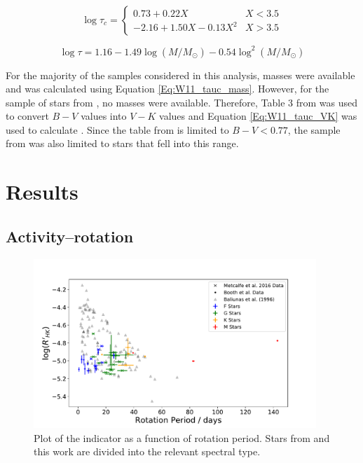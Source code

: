 \begin{equation}
    \log \tau_{c} = 
    \begin{cases}
        0.73 + 0.22X & X < 3.5 \\
        -2.16 +1.50X - 0.13X^{2} & X > 3.5
    \end{cases}
    \label{Eq:W11_tauc_VK}
\end{equation}

\begin{equation}
    \log \tau = 1.16 - 1.49\log(M/M_{\odot}) - 0.54\log^{2}(M/M_{\odot})
    \label{Eq:W11_tauc_mass}
\end{equation}

For the majority of the samples considered in this analysis, masses were available and \tauc was calculated using Equation \ref{Eq:W11_tauc_mass}. However, for the sample of stars from \citet{Baliunas_etal_1996}, no masses were available. Therefore, Table 3 from \citet{Pecaut_etal_2012} was used to convert $B-V$ values into $V-K$ values and Equation \ref{Eq:W11_tauc_VK} was used to calculate \tauc. Since the table from \citet{Pecaut_etal_2012} is limited to $B-V < 0.77$, the sample from \citet{Baliunas_etal_1996} was also limited to stars that fell into this range.

\section{Results}

\subsection{Activity--rotation}
\label{Chp5_results_activity_rotation}

\begin{figure}
    \centering
    \includegraphics[width=0.95\textwidth]{Figures/5-Activity_rotation/Rhk_v_prot.pdf}
    \caption[\Rprime indicator as a function of rotation period]{Plot of the \Rprime indicator as a function of rotation period. Stars from \citet{Metcalfe_etal_2016} and this work are divided into the relevant spectral type.}
    \label{fig:rhk_v_rot}
\end{figure}

